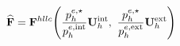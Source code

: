 \documentclass[preview]{standalone}
\begin{document}
\begin{align*}
\special{dvisvgm:raw <g id='unique000'>}\widehat{\mathbf{F}} = \mathbf{F}^{hllc}\!\left(\frac{p_h^{e,\star}}{p_h^{e,\text{int}}}\mathbf{U}_h^{\text{int}},\ \frac{p_h^{e,\star}}{p_h^{e,\text{ext}}}\mathbf{U}_h^{\text{ext}}\right)\special{dvisvgm:raw </g>}
\end{align*}
\end{document}
